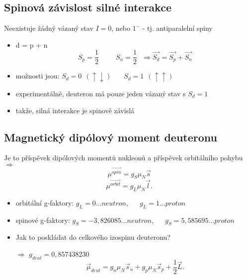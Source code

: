 \documentclass[../../main.tex]{subfiles}
\begin{document}
\subsection{Spinová závislost silné interakce}

Neexistuje žádný  vázaný stav $I=0$, nebo $1^{-}$ - tj. antiparalelní spiny
\begin{itemize}
	\item d = p + n
	\begin{equation}
	S_p = \dfrac{1}{2} ~~~~~~~~~~~ S_n = \dfrac{1}{2}  ~~~ \Rightarrow \vec{S_d} = \vec{S_p} + \vec{S_n}
	\end{equation}
	
	\item možnosti jsou: $S_d  = 0 ~~ (\uparrow \downarrow)	 ~~~~~~~~ S_d = 1 ~~ (\uparrow \uparrow)$
	
	\item experimentálně, deuteron má pouze jeden vázaný stav s $S_d = 1$
	
	\item takže, silná interakce je spinově závislá
\end{itemize}

\subsection{Magnetický dipólový moment deuteronu}

Je to příspěvek dipólových momentů nukleonů a příspěvek orbitálního pohybu $\Rightarrow$
\begin{equation}
\mu ^{\vec{spin}} = g_S \mu _N \vec{s}
\end{equation}
\begin{equation}
\mu ^{\vec{orbit}} = g_L \mu _N \vec{l}.
\end{equation}
\begin{itemize}
	\item orbitální g-faktory: $g_L = 0 ... neutron$, ~~ $g_L = 1 ... proton$
	\item spinové g-faktory: $g_S = - 3,826085 ... neutron$, ~~ $g_S = 5,585695 ... proton$
	\item Jak to poskládat do celkového izospinu deuteronu?
	
	$\Rightarrow$ $g_{deut} = 0,857438230$ 
	\begin{equation}
	\vec{\mu} _{deut} = g_n \mu _N \vec{s}_n + g_p \mu _N \vec{s}_p + \dfrac{1}{2} \vec{L}.
	\end{equation}
	\end{itemize}
\end{document}
